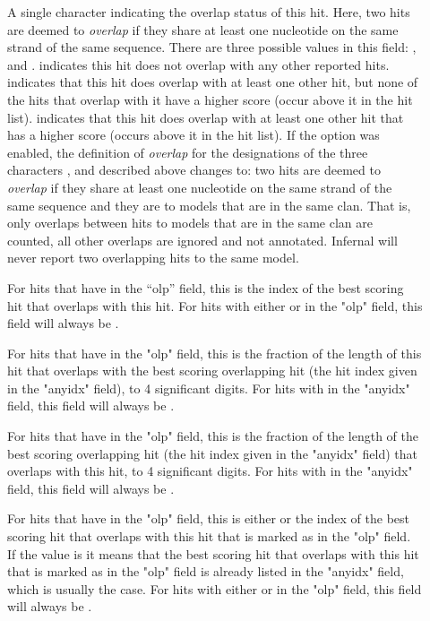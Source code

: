 \begin{description}

\item[] A single character indicating the overlap status
  of this hit. Here, two hits are deemed to \emph{overlap} if they
  share at least one nucleotide on the same strand of the same
  sequence. There are three possible values in this field: \ccode{*},
  \ccode{\^} and \ccode{=}.  \ccode{*} indicates this hit does not
  overlap with any other reported hits. \ccode{\^} indicates that this
  hit does overlap with at least one other hit, but none of the hits
  that overlap with it have a higher score (occur above it in the hit
  list). \ccode{=} indicates that this hit does overlap with at least
  one other hit that has a higher score (occurs above it in the hit
  list). If the  option was enabled, the definition of
  \emph{overlap} for the designations of the three characters
  \ccode{*}, \ccode{\^} and \ccode{=} described above changes to: two
  hits are deemed to \emph{overlap} if they share at least one
  nucleotide on the same strand of the same sequence and they are to
  models that are in the same clan. That is, only overlaps between
  hits to models that are in the same clan are counted, all other
  overlaps are ignored and not annotated.  Infernal will never report
  two overlapping hits to the same model.

\item[]
For hits that have \ccode{=} in the ``olp'' field, this is the
index of the best scoring hit that overlaps with this hit.
For hits with either \ccode{*} or \ccode{\^} in the "olp" field,
this field will always be \ccode{-}.

\item[]
For hits that have \ccode{=} in the "olp" field, this is the
fraction of the length of this hit that overlaps with the best scoring
overlapping hit (the hit index given in the "anyidx" field), to
4 significant digits. 
For hits with \ccode{-} in the "anyidx"
field, this field will always be \ccode{-}.  

\item[]
For hits that have \ccode{=} in the "olp" field, this is the
fraction of the length of the best scoring overlapping hit (the hit
index given in the "anyidx" field) that overlaps with this hit,
to 4 significant digits. 
For hits with \ccode{-} in the "anyidx"
field, this field will always be \ccode{-}.  

\item[] 
For hits that have \ccode{=} in the "olp" field, this is either
 or the index of the best scoring hit that overlaps with this
hit that is marked as \ccode{\^} in the "olp" field. If the value
is  it means that the best scoring hit that overlaps with
this hit that is marked as \ccode{\^} in the "olp" field is
already listed in the "anyidx" field, which is usually the case.
For hits with either \ccode{*} or \ccode{\^} in the "olp" field,
this field will always be \ccode{-}.


\end{description}
